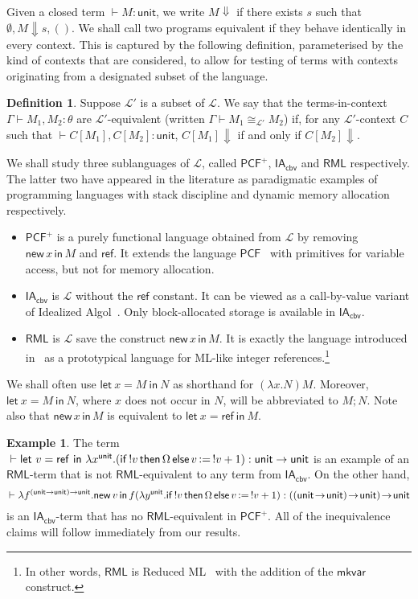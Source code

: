 \documentclass{CSML}
\theoremstyle{definition}\newtheorem{definition}[thm]{Definition}
\theoremstyle{definition}\newtheorem{example}[thm]{Example}
\theoremstyle{definition}\newtheorem{proposition}[thm]{Proposition}
\theoremstyle{definition}\newtheorem{lemma}[thm]{Lemma}
\theoremstyle{definition}\newtheorem{theorem}[thm]{Theorem}
\theoremstyle{definition}\newtheorem{corollary}[thm]{Corollary}
\theoremstyle{definition}\newtheorem{remark}[thm]{Remark}
\newcommand\nt[1]{#1}
\newcommand\am[1]{#1}
\newcommand\dom[1]{\mathsf{dom}\,#1}
\newcommand\langp{\mathcal{L}'}
\newcommand\eqmod[1]{\cong_{#1}}
\newcommand\pcfplus{\mathsf{PCF}^+}
\newcommand\iacbv{\mathsf{IA}_{\mathsf{cbv}}}
\newcommand\rml{\mathsf{RML}}
\newcommand\ds{\displaystyle}
\newcommand\letin[2]{\mathsf{let}\ #1\ \mathsf{in}\ #2}
\newcommand\mkvar{\mathsf{mkvar}}
\newcommand{\aasg}{\,\raisebox{0.065ex}{:}{=}\,}
\newcommand\comt{\mathsf{unit}}
\renewcommand\red[2]{#1 \Downarrow #2}
\newcommand\cond[3]{\mathsf{if}\,#1\,\mathsf{then}\,#2\,\mathsf{else}\,#3}
\newcommand{\rarr}{\rightarrow}
\newcommand\cutout[1]{}
\newcommand\seq[2]{{#1} \vdash {#2}}
\newcommand\lang{\mathcal{L}}
\newcommand\new[2]{\mathsf{new}\,#1\,\mathsf{in}\,#2}
\newcommand\newc{\mathsf{ref}}
\newcommand\na\alpha
\begin{document}
\cutout{
Here we only reproduce the two evaluation rules related to variable creation.
\[
\frac{\ds\red{s\cup(\alpha\mapsto 0),M[\alpha/x]}{s',V}}{\ds\red{s,\new{x}{M}}{s'\setminus \na, V}}
{\ \scriptstyle\na\notin\dom{s}}
\qquad
\frac{}{\ds\red{s,\newc}{s\cup(\na\mapsto 0), \na}}
{\ \scriptstyle\na\notin\dom{s}}
\]
}

Given a closed term $\seq{}{M:\comt}$, we write $M\Downarrow$ 
if there exists $s$ such that $\red{\emptyset,M}{s,()}$.
We shall call two programs equivalent if they behave identically 
in every context. This is captured by the following definition, 
parameterised by the kind of contexts that are considered,
to allow for testing of terms with contexts originating from a designated 
subset of the language.

\begin{definition}
Suppose $\langp$ is a subset of $\lang$.
We say that the terms-in-context $\seq{\Gamma}{M_1, M_2:\theta}$ 
are $\langp$-equivalent (written $\seq{\Gamma}{M_1\eqmod{\langp} M_2}$)
if, for any $\langp$-context ${C}$ such that $\seq{}{{C}[M_1],{C}[M_2]:\comt}$,
${C}[M_1]\Downarrow$ if and only if  ${C}[M_2]\Downarrow$.
\end{definition}

We shall study three sublanguages of $\lang$, called
$\pcfplus$, $\iacbv$ and $\rml$ respectively. The latter two
have appeared in the literature as paradigmatic examples of programming
languages with stack discipline and dynamic memory allocation respectively.
\begin{itemize}
\item 
$\pcfplus$ is a purely functional language obtained from $\lang$ by removing
$\new{x}{M}$ and $\newc$. It extends the language $\mathsf{PCF}$~\cite{Plo77}
with primitives for variable access, but not for memory allocation.
\item 
$\iacbv$ is $\lang$ without the $\newc$ constant.
It can be viewed as  a call-by-value variant of Idealized Algol~\cite{Rey81}.
Only block-allocated storage is available in $\iacbv$.
\item 
$\rml$ is $\lang$ save the construct $\new{x}{M}$. It is exactly the language
introduced in~\cite{AM97b} as a prototypical language for ML-like integer references.\footnote{\nt{In other words, $\rml$ is Reduced ML~\cite{Sta95} with the addition of the $\mkvar$ construct.}}
\end{itemize}
{We shall often use $\letin{x=M}{N}$  as shorthand for $(\lambda x.N)M$. 
Moreover, $\letin{x=M}{N}$, where $x$ does not occur in $N$, will be abbreviated to $M;N$.}
Note also that $\new{x}{M}$ is equivalent to $\letin{x=\newc}{M}$.
\nt{\begin{example}
The term $\seq{}{\letin{v=\newc}{\lambda x^\comt. (\cond{!v}{\Omega}{v\aasg !v+1}}):\comt\rarr\comt}$ is an example of an $\rml$-term 
that is not \am{$\rml$-equivalent} to any term from $\iacbv$.
On the other hand, 
\[
\seq{\!}{\lambda f^{(\comt\rarr\comt)\rarr\comt}.\new{v}{f(\lambda y^\comt.\cond{!v}{\Omega}{v\aasg !v+1})}:((\comt\!\rarr\!\comt)\!\rarr\!\comt)\!\rarr\!\comt}
\]
is an $\iacbv$-term that has no \am{$\rml$-equivalent} in $\pcfplus$. All of  the inequivalence claims will follow immediately from our results.
\end{example}}
\end{document}
